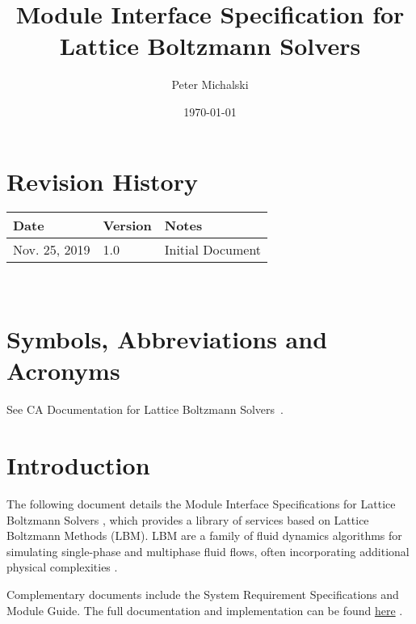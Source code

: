 \documentclass[12pt, titlepage]{article}
\newcommand{\famname}{Lattice Boltzmann Solvers}
\begin{document}
\title{Module Interface Specification for \famname}

\author{Peter Michalski}

\date{\today}

\maketitle


\section{Revision History} \label{MISREVHISTORY}

\begin{tabularx}{\textwidth}{p{3cm}p{2cm}X}
\toprule {\bf Date} & {\bf Version} & {\bf Notes}\\
\midrule
Nov. 25, 2019 & 1.0 & Initial Document\\
\bottomrule
\end{tabularx}

~\newpage

\section{Symbols, Abbreviations and Acronyms}

See CA Documentation for \famname \ \citep{LBM_CA_PM}.

\newpage

\tableofcontents

\newpage


\section{Introduction}

The following document details the Module Interface Specifications for \famname
, which provides a library of services based on Lattice Boltzmann Methods (LBM).
LBM are a family of fluid dynamics algorithms for simulating single-phase and
multiphase fluid flows, often incorporating additional physical complexities
\citep{chen1998lattice}.

Complementary documents include the System Requirement Specifications
and Module Guide.  The full documentation and implementation can be
found \href{https://github.com/peter-michalski/LatticeBoltzmannSolvers}{here} \citep{LBM_PM}.
\end{document}
